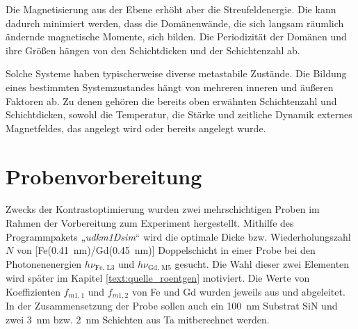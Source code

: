 \noindent
Die Magnetisierung aus der Ebene erhöht aber die Streufeldenergie. Die kann dadurch minimiert werden, dass die Domänenwände, die sich langsam räumlich ändernde magnetische Momente, sich bilden. Die Periodizität der Domänen und ihre Größen hängen von den Schichtdicken und der Schichtenzahl ab. 

\noindent
Solche Systeme haben typischerweise diverse metastabile Zustände. Die Bildung eines bestimmten Systemzustandes hängt von mehreren inneren und äußeren Faktoren ab. Zu denen gehören die bereits oben erwähnten Schichtenzahl und Schichtdicken, sowohl die Temperatur, die Stärke und zeitliche Dynamik externes Magnetfeldes, das angelegt wird oder bereits angelegt wurde.



\section{Probenvorbereitung}
Zwecks der Kontrastoptimierung wurden zwei mehrschichtigen Proben im Rahmen der Vorbereitung zum Experiment hergestellt. Mithilfe des Programmpakets „\emph{udkm1Dsim}“ \cite{schick_udkm1dsim_2021} wird die optimale Dicke bzw. Wiederholungszahl $N$ von [Fe(\SI{0.41}{\nano\meter})/Gd(\SI{0.45}{\nano\meter})] Doppelschicht in einer Probe bei den Photonenenergien $h\nu_{\text{Fe, L3}}$ und $h\nu_{\text{Gd, M5}}$ gesucht. Die Wahl dieser zwei Elementen wird später im Kapitel \ref{text:quelle_roentgen} motiviert. Die Werte von Koeffizienten $f_{m1,1}$ und $f_{m1,2}$ von Fe und Gd wurden jeweils aus \cite[Abb. 4]{kortright_resonant_2000} und \cite[Abb. 2]{prieto-x-ray-2005} abgeleitet. In der Zusammensetzung der Probe sollen auch ein \SI{100}{\nano\meter} Substrat SiN und zwei \SI{3}{\nano\meter} bzw. \SI{2}{\nano\meter} Schichten aus Ta mitberechnet werden.


